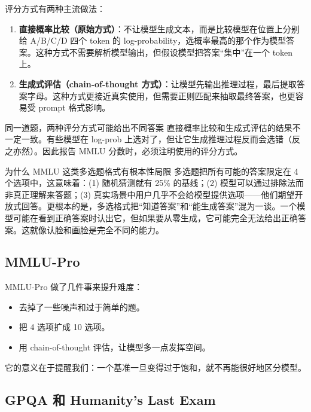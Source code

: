\documentclass[a4paper]{article}
\begin{document}
评分方式有两种主流做法：

\begin{enumerate}
    \item \textbf{直接概率比较（原始方式）}：不让模型生成文本，而是比较模型在位置上分别给 A/B/C/D 四个 token 的 log-probability，选概率最高的那个作为模型答案。这种方式不需要解析模型输出，但假设模型把答案``集中''在一个 token 上。
    \item \textbf{生成式评估（chain-of-thought 方式）}：让模型先输出推理过程，最后提取答案字母。这种方式更接近真实使用，但需要正则匹配来抽取最终答案，也更容易受 prompt 格式影响。
\end{enumerate}

\begin{warningbox}{同一道题，两种评分方式可能给出不同答案}
直接概率比较和生成式评估的结果不一定一致。有些模型在 log-prob 上选对了，但让它生成推理过程反而会选错（反之亦然）。因此报告 MMLU 分数时，必须注明使用的评分方式。
\end{warningbox}

\begin{knowledgebox}{为什么 MMLU 这类多选题格式有根本性局限}
多选题把所有可能的答案限定在 4 个选项中，这意味着：(1) 随机猜测就有 25\% 的基线；(2) 模型可以通过排除法而非真正理解来答题；(3) 真实场景中用户几乎不会给模型提供选项——他们期望开放式回答。更根本的是，多选格式把``知道答案''和``能生成答案''混为一谈。一个模型可能在看到正确答案时认出它，但如果要从零生成，它可能完全无法给出正确答案。这就像认脸和画脸是完全不同的能力。
\end{knowledgebox}

\subsection{MMLU-Pro}

MMLU-Pro 做了几件事来提升难度：

\begin{itemize}
    \item 去掉了一些噪声和过于简单的题。
    \item 把 4 选项扩成 10 选项。
    \item 用 chain-of-thought 评估，让模型多一点发挥空间。
\end{itemize}

它的意义在于提醒我们：一个基准一旦变得过于饱和，就不再能很好地区分模型。

\subsection{GPQA 和 Humanity's Last Exam}
\end{document}
